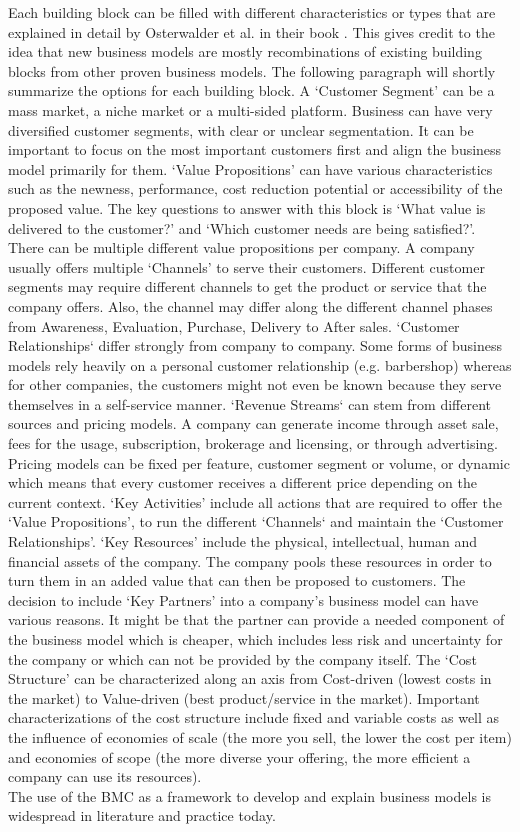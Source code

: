 		Each building block can be filled with different characteristics or types that are explained in detail by Osterwalder et al. in their book \cite{osterwalder}. This gives credit to the idea that new business models are mostly  recombinations of existing building blocks from other proven business models. The following paragraph will shortly summarize the options for each building block. A `Customer Segment' can be a mass market, a niche market or a multi-sided platform. Business can have very diversified customer segments, with clear or unclear segmentation. It can be important to focus on the most important customers first and align the business model primarily for them. `Value Propositions' can have various characteristics such as the newness, performance, cost reduction potential or accessibility of the proposed value. The key questions to answer with this block is `What value is delivered to the customer?' and `Which customer needs are being satisfied?'. There can be multiple different value propositions per company. A company usually offers multiple `Channels' to serve their customers. Different customer segments may require different channels to get the product or service that the company offers. Also, the channel may differ along the different channel phases from Awareness, Evaluation, Purchase, Delivery to After sales. `Customer Relationships` differ strongly from company to company. Some forms of business models rely heavily on a personal customer relationship (e.g. barbershop) whereas for other companies, the customers might not even be known because they serve themselves in a self-service manner. `Revenue Streams` can stem from different sources and pricing models. A company can generate income through asset sale, fees for the usage, subscription, brokerage and licensing, or through advertising. Pricing models can be fixed per feature, customer segment or volume, or dynamic which means that every customer receives a different price depending on the current context. `Key Activities' include all actions that are required to offer the `Value Propositions', to run the different `Channels` and maintain the `Customer Relationships'. `Key Resources' include the physical, intellectual, human and financial assets of the company. The company pools these resources in order to turn them in an added value that can then be proposed to customers. The decision to include `Key Partners' into a company's business model can have various reasons. It might be that the partner can provide a needed component of the business model which is cheaper, which includes less risk and uncertainty for the company or which can not be provided by the company itself. The `Cost Structure' can be characterized along an axis from Cost-driven (lowest costs in the market) to Value-driven (best product/service in the market). Important characterizations of the cost structure include fixed and variable costs as well as the influence of economies of scale (the more you sell, the lower the cost per item) and economies of scope (the more diverse your offering, the more efficient a company can use its resources).\\
		The use of the BMC as a framework to develop and explain business models is widespread in literature and practice today.
\vspace{-1em}
